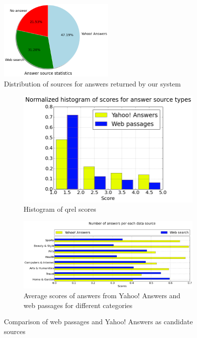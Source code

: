 \documentclass[]{article}
\begin{document}
\begin{figure}
\centering
	\includegraphics[width=0.5\textwidth]{img/answer_source}
	\caption{Distribution of sources for answers returned by our system}
	\label{figure:answer_source_pie}
\end{figure}

\begin{figure}
\centering
	\begin{subfigure}[b]{0.38\textwidth}
	\includegraphics[width=\textwidth]{img/answer_source_scores}
	\caption{Histogram of qrel scores}
	\label{figure:answer_source:scores}
	\end{subfigure}
	\begin{subfigure}[b]{0.6\textwidth}
	\includegraphics[width=\textwidth]{img/answer_source_by_category}
	\caption{Average scores of answers from Yahoo! Answers and web passages for different categories}
	\label{figure:answer_source:category}
	\end{subfigure}
	\caption{Comparison of web passages and Yahoo! Answers as candidate sources}
	\label{figure:answer_source}
\end{figure}
\end{document}
